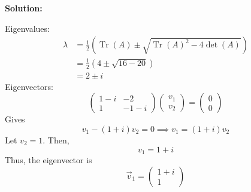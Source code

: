 \documentclass[12pt]{article}
\DeclareMathOperator{\Tr}{Tr}
\newenvironment{solution}{
    \textbf{Solution:}
    
}{
    
    \vspace{2em}
}
\begin{document}
\begin{solution}
    Eigenvalues:
    \[
        \begin{aligned}
            \lambda &= \frac{1}{2}(\Tr(A) \pm \sqrt{\Tr(A)^2 - 4\det(A)}) \\
            &= \frac{1}{2}(4 \pm \sqrt{16 - 20}) \\
            &= 2 \pm i
        \end{aligned}
    \]
    Eigenvectors:
    \[
        \begin{pmatrix} 1 - i & -2 \\ 1 & -1-i \end{pmatrix} \begin{pmatrix} v_1 \\ v_2 \end{pmatrix} = \begin{pmatrix} 0 \\ 0 \end{pmatrix}
    \]
    Gives
    \[
        v_1 - (1 + i)v_2 = 0 \implies v_1 = (1 + i)v_2
    \]
    Let \(v_2 = 1\). Then,
    \[
        v_1 = 1 + i
    \]
    Thus, the eigenvector is
    \[
        \vec{v}_1 = \begin{pmatrix} 1 + i \\ 1 \end{pmatrix}
    \]


\end{solution}
\end{document}
